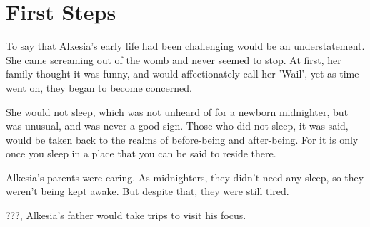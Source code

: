 

\chapter{First Steps}

To say that Alkesia's early life had been challenging would be an understatement.
She came screaming out of the womb and never seemed to stop. 
At first, her family thought it was funny, and would affectionately call her 'Wail', yet as time went on, they began to become concerned.

She would not sleep, which was not unheard of for a newborn midnighter, but was unusual, and was never a good sign. 
Those who did not sleep, it was said, would be taken back to the realms of before-being and after-being. 
For it is only once you sleep in a place that you can be said to reside there.

Alkesia's parents were caring. 
As midnighters, they didn't need any sleep, so they weren't being kept awake.
But despite that, they were still tired.

???, Alkesia's father would take trips to visit his focus.

%

